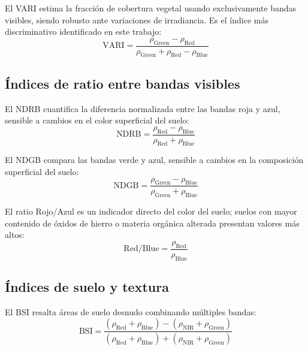El \ac{VARI} estima la fracción de cobertura vegetal usando exclusivamente
bandas visibles, siendo robusto ante variaciones de irradiancia. Es el
índice más discriminativo identificado en este trabajo:
\begin{equation}
  \text{VARI} = \frac{\rho_{\text{Green}} - \rho_{\text{Red}}}
                     {\rho_{\text{Green}} + \rho_{\text{Red}} - \rho_{\text{Blue}}}
  \label{eq:vari}
\end{equation}

\subsection{Índices de ratio entre bandas visibles}

El \ac{NDRB} cuantifica la diferencia normalizada entre las bandas roja
y azul, sensible a cambios en el color superficial del suelo:
\begin{equation}
  \text{NDRB} = \frac{\rho_{\text{Red}} - \rho_{\text{Blue}}}
                     {\rho_{\text{Red}} + \rho_{\text{Blue}}}
  \label{eq:ndrb}
\end{equation}

El \ac{NDGB} compara las bandas verde y azul, sensible a cambios en la
composición superficial del suelo:
\begin{equation}
  \text{NDGB} = \frac{\rho_{\text{Green}} - \rho_{\text{Blue}}}
                     {\rho_{\text{Green}} + \rho_{\text{Blue}}}
  \label{eq:ndgb}
\end{equation}

El ratio Rojo/Azul es un indicador directo del color del suelo; suelos con
mayor contenido de óxidos de hierro o materia orgánica alterada presentan
valores más altos:
\begin{equation}
  \text{Red/Blue} = \frac{\rho_{\text{Red}}}{\rho_{\text{Blue}}}
  \label{eq:redblue}
\end{equation}

\subsection{Índices de suelo y textura}

El \ac{BSI} resalta áreas de suelo desnudo combinando múltiples bandas:
\begin{equation}
  \text{BSI} = \frac{(\rho_{\text{Red}} + \rho_{\text{Blue}}) -
                     (\rho_{\text{NIR}} + \rho_{\text{Green}})}
                    {(\rho_{\text{Red}} + \rho_{\text{Blue}}) +
                     (\rho_{\text{NIR}} + \rho_{\text{Green}})}
  \label{eq:bsi}
\end{equation}

